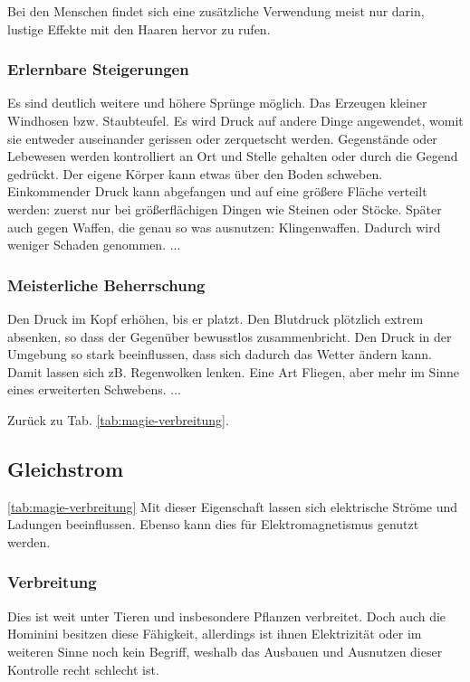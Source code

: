 Bei den Menschen findet sich eine zusätzliche Verwendung meist nur darin, lustige Effekte mit den Haaren hervor zu rufen.

\subsubsection{Erlernbare Steigerungen}
\begin{outline}
	\1 Es sind deutlich weitere und höhere Sprünge möglich.
	\1 Das Erzeugen kleiner Windhosen bzw. Staubteufel.
	\1 Es wird Druck auf andere Dinge angewendet, womit sie entweder auseinander gerissen oder zerquetscht werden.
	\1 Gegenstände oder Lebewesen werden kontrolliert an Ort und Stelle gehalten oder durch die Gegend gedrückt.
	\1 Der eigene Körper kann etwas über den Boden schweben.
	\1 Einkommender Druck kann abgefangen und auf eine größere Fläche verteilt werden: zuerst nur bei größerflächigen Dingen wie Steinen oder Stöcke. Später auch gegen Waffen, die genau so was ausnutzen: Klingenwaffen. Dadurch wird weniger Schaden genommen.
	\1 ...
\end{outline}

\subsubsection{Meisterliche Beherrschung} 
\begin{outline}
	\1 Den Druck im Kopf erhöhen, bis er platzt.
	\1 Den Blutdruck plötzlich extrem absenken, so dass der Gegenüber bewusstlos zusammenbricht. 
	\1 Den Druck in der Umgebung so stark beeinflussen, dass sich dadurch das Wetter ändern kann. Damit lassen sich zB. Regenwolken lenken. 
	\1 Eine Art Fliegen, aber mehr im Sinne eines erweiterten Schwebens.
	\1 ...
\end{outline}
Zurück zu Tab. \ref{tab:magie-verbreitung}.



\subsection{Gleichstrom}\label{sec:gleichstrommagie} \ref{tab:magie-verbreitung} %
Mit dieser Eigenschaft lassen sich elektrische Ströme und Ladungen beeinflussen. Ebenso kann dies für Elektromagnetismus genutzt werden.

\subsubsection{Verbreitung}
Dies ist weit unter Tieren und insbesondere Pflanzen verbreitet. Doch auch die Hominini besitzen diese Fähigkeit, allerdings ist ihnen Elektrizität oder im weiteren Sinne noch kein Begriff, weshalb das Ausbauen und Ausnutzen dieser Kontrolle recht schlecht ist.

